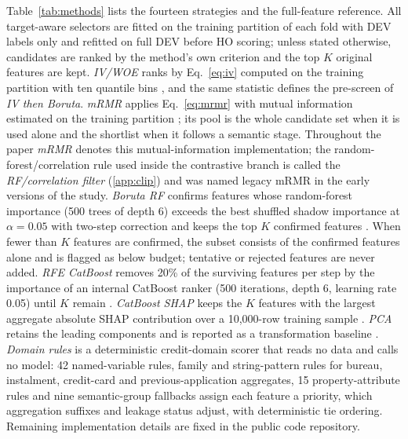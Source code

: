 \documentclass[final,5p,twocolumn]{elsarticle}
\newcommand{\Kfeat}{K}
\begin{document}
Table~\ref{tab:methods} lists the fourteen strategies and the full-feature reference. All target-aware selectors are fitted on the training partition of each fold with DEV labels only and refitted on full DEV before HO scoring; unless stated otherwise, candidates are ranked by the method's own criterion and the top $\Kfeat$ original features are kept. \emph{IV/WOE} ranks by Eq.~\eqref{eq:iv} computed on the training partition with ten quantile bins \cite{siddiqi2006}, and the same statistic defines the pre-screen of \emph{IV then Boruta}. \emph{mRMR} applies Eq.~\eqref{eq:mrmr} with mutual information estimated on the training partition \cite{peng2005,kraskov2004,ross2014}; its pool is the whole candidate set when it is used alone and the shortlist when it follows a semantic stage. Throughout the paper \emph{mRMR} denotes this mutual-information implementation; the random-forest/correlation rule used inside the contrastive branch is called the \emph{RF/correlation filter} (\ref{app:clip}) and was named legacy mRMR in the early versions of the study. \emph{Boruta RF} confirms features whose random-forest importance (500 trees of depth 6) exceeds the best shuffled shadow importance at $\alpha=0.05$ with two-step correction and keeps the top $\Kfeat$ confirmed features \cite{kursa2010,breiman2001}. When fewer than $\Kfeat$ features are confirmed, the subset consists of the confirmed features alone and is flagged as below budget; tentative or rejected features are never added. \emph{RFE CatBoost} removes 20\% of the surviving features per step by the importance of an internal CatBoost ranker (500 iterations, depth 6, learning rate 0.05) until $\Kfeat$ remain \cite{guyon2002}. \emph{CatBoost SHAP} keeps the $\Kfeat$ features with the largest aggregate absolute SHAP contribution over a 10,000-row training sample \cite{lundberg2017}. \emph{PCA} retains the leading components and is reported as a transformation baseline \cite{jolliffe2016}. \emph{Domain rules} is a deterministic credit-domain scorer that reads no data and calls no model: 42 named-variable rules, family and string-pattern rules for bureau, instalment, credit-card and previous-application aggregates, 15 property-attribute rules and nine semantic-group fallbacks assign each feature a priority, which aggregation suffixes and leakage status adjust, with deterministic tie ordering. Remaining implementation details are fixed in the public code repository.
\end{document}
